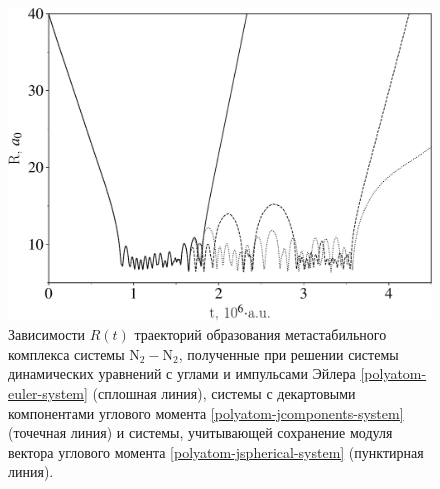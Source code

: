 \begin{figure}[H]
    \centering
    \includegraphics[width=0.85\linewidth]{./pictures/trajectories/trajectory-comparison-crop.pdf}
    \caption{Зависимости $R(t)$ траекторий образования метастабильного комплекса системы N$_2-$N$_2$, полученные при решении системы динамических уравнений с углами и импульсами Эйлера \eqref{polyatom-euler-system} (сплошная линия), системы с декартовыми компонентами углового момента \eqref{polyatom-jcomponents-system} (точечная линия) и системы, учитывающей сохранение модуля вектора углового момента \eqref{polyatom-jspherical-system} (пунктирная линия).}
    \label{fig:trajectory-comparison}
\end{figure}

